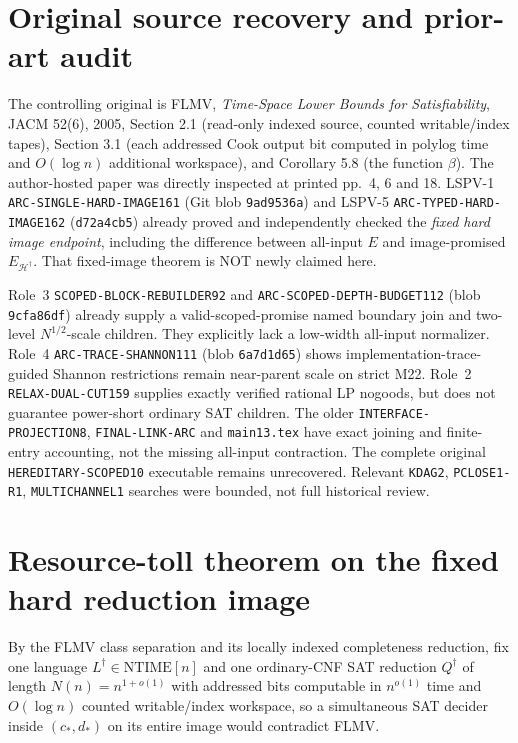 \documentclass[11pt]{article}
\begin{document}
\section{Original source recovery and prior-art audit}
The controlling original is FLMV, \emph{Time-Space Lower Bounds for
Satisfiability}, JACM 52(6), 2005, Section 2.1 (read-only indexed source,
counted writable/index tapes), Section 3.1 (each addressed Cook output
bit computed in polylog time and $O(\log n)$ additional workspace), and
Corollary 5.8 (the function $\beta$). The author-hosted paper was
directly inspected at printed pp.~4, 6 and 18. LSPV-1
\texttt{ARC-SINGLE-HARD-IMAGE161} (Git blob \texttt{9ad9536a})
and LSPV-5 \texttt{ARC-TYPED-HARD-IMAGE162}
(\texttt{d72a4cb5}) already proved and independently checked the
\emph{fixed hard image endpoint}, including the difference between
all-input $E$ and image-promised $E_{\mathcal H^\dagger}$.
That fixed-image theorem is NOT newly claimed here.

Role~3 \texttt{SCOPED-BLOCK-REBUILDER92} and
\texttt{ARC-SCOPED-DEPTH-BUDGET112} (blob \texttt{9cfa86df})
already supply a valid-scoped-promise named boundary join and two-level
$N^{1/2}$-scale children. They explicitly lack a low-width all-input
normalizer. Role~4 \texttt{ARC-TRACE-SHANNON111}
(blob \texttt{6a7d1d65}) shows implementation-trace-guided Shannon
restrictions remain near-parent scale on strict M22.
Role~2 \texttt{RELAX-DUAL-CUT159} supplies exactly verified rational
LP nogoods, but does not guarantee power-short ordinary SAT children.
The older \texttt{INTERFACE-PROJECTION8},
\texttt{FINAL-LINK-ARC} and \texttt{main13.tex} have exact joining and
finite-entry accounting, not the missing all-input contraction.
The complete original \texttt{HEREDITARY-SCOPED10} executable remains
unrecovered. Relevant \texttt{KDAG2}, \texttt{PCLOSE1-R1},
\texttt{MULTICHANNEL1} searches were bounded, not full historical review.

\section{Resource-toll theorem on the fixed hard reduction image}
By the FLMV class separation and its locally indexed completeness
reduction, fix one language
$L^\dagger\in\mathrm{NTIME}[n]$ and one ordinary-CNF SAT reduction
$Q^\dagger$ of length
$N(n)=n^{1+o(1)}$ with addressed bits computable in $n^{o(1)}$
time and $O(\log n)$ counted writable/index workspace, so a
simultaneous SAT decider inside $(c_*,d_*)$ on its entire image
would contradict FLMV.
\end{document}

